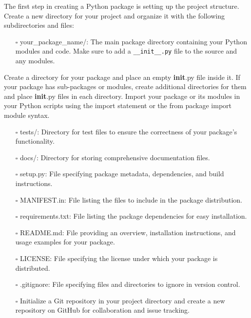 \documentclass[
  letterpaper,
  DIV=11,
  numbers=noendperiod]{scrreprt}
\providecommand{\tightlist}{%
  \setlength{\itemsep}{0pt}\setlength{\parskip}{0pt}}\usepackage{longtable,booktabs,array}
\begin{document}
The first step in creating a Python package is setting up the project
structure. Create a new directory for your project and organize it with
the following subdirectories and files:

\begin{itemize}
\tightlist
\item[$\square$]
  your\_package\_name/: The main package directory containing your
  Python modules and code. Make sure to add a \texttt{\_\_init\_\_.py}
  file to the source and any modules.
\end{itemize}

\begin{tcolorbox}[enhanced jigsaw, opacitybacktitle=0.6, breakable, title=\textcolor{quarto-callout-tip-color}{\faLightbulb}\hspace{0.5em}{\textbf{init}.py}, arc=.35mm, colframe=quarto-callout-tip-color-frame, colbacktitle=quarto-callout-tip-color!10!white, left=2mm, bottomrule=.15mm, opacityback=0, toprule=.15mm, bottomtitle=1mm, toptitle=1mm, titlerule=0mm, leftrule=.75mm, colback=white, rightrule=.15mm, coltitle=black]

Create a directory for your package and place an empty \textbf{init}.py
file inside it. If your package has sub-packages or modules, create
additional directories for them and place \textbf{init}.py files in each
directory. Import your package or its modules in your Python scripts
using the import statement or the from package import module syntax.

\end{tcolorbox}

\begin{itemize}
\tightlist
\item[$\square$]
  tests/: Directory for test files to ensure the correctness of your
  package's functionality.
\item[$\square$]
  docs/: Directory for storing comprehensive documentation files.
\item[$\square$]
  setup.py: File specifying package metadata, dependencies, and build
  instructions.
\item[$\square$]
  MANIFEST.in: File listing the files to include in the package
  distribution.
\item[$\square$]
  requirements.txt: File listing the package dependencies for easy
  installation.
\item[$\square$]
  README.md: File providing an overview, installation instructions, and
  usage examples for your package.
\item[$\square$]
  LICENSE: File specifying the license under which your package is
  distributed.
\item[$\square$]
  .gitignore: File specifying files and directories to ignore in version
  control.
\item[$\square$]
  Initialize a Git repository in your project directory and create a new
  repository on GitHub for collaboration and issue tracking.
\end{itemize}
\end{document}
